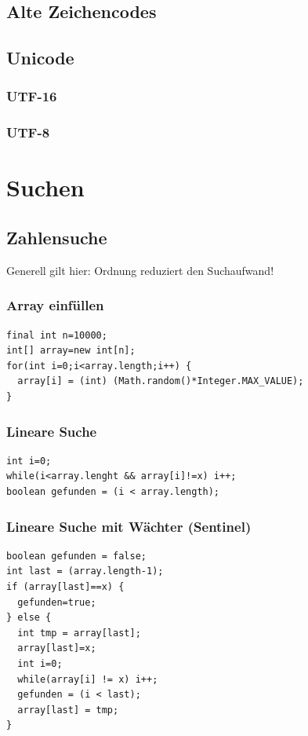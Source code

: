 \documentclass[a4paper,10pt]{article}
\begin{document}
\subsection{Alte Zeichencodes}

\subsection{Unicode}

\subsubsection{UTF-16}

\subsubsection{UTF-8}


\newpage
\section{Suchen}

\subsection{Zahlensuche}
Generell gilt hier: Ordnung reduziert den Suchaufwand!

\subsubsection{Array einf\"ullen}
\begin{lstlisting}
final int n=10000;
int[] array=new int[n];
for(int i=0;i<array.length;i++) {
  array[i] = (int) (Math.random()*Integer.MAX_VALUE);
}
\end{lstlisting}

\subsubsection{Lineare Suche}
\begin{lstlisting}
int i=0;
while(i<array.lenght && array[i]!=x) i++;
boolean gefunden = (i < array.length);
\end{lstlisting}

\subsubsection{Lineare Suche mit W\"achter (Sentinel)}
\begin{lstlisting}
boolean gefunden = false;
int last = (array.length-1);
if (array[last]==x) {
  gefunden=true;
} else {
  int tmp = array[last];
  array[last]=x;
  int i=0;
  while(array[i] != x) i++;
  gefunden = (i < last);
  array[last] = tmp;
}
\end{lstlisting}
\end{document}
